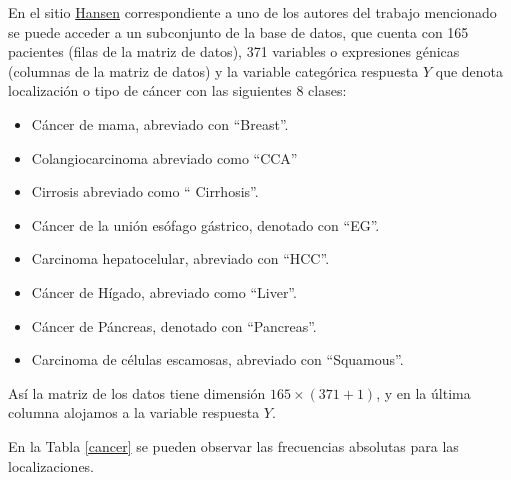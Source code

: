 \documentclass{report}
\begin{document}
 En el sitio  \href{https://github.com/nielsrhansen/msgl/blob/master/data/PrimaryCancers.RData}{Hansen} correspondiente a uno de los autores del trabajo mencionado se puede acceder a un subconjunto de la base de datos, que cuenta con 165 pacientes (filas de la matriz de datos), 371 variables o expresiones génicas (columnas de la matriz de datos)  y la variable categórica respuesta $Y$ que denota localización o tipo de cáncer con las siguientes 8 clases: 
 \begin{itemize}
 	\item Cáncer de mama, abreviado con ``Breast''.
 	\item Colangiocarcinoma abreviado como ``CCA'' %
 	\item  Cirrosis abreviado como `` Cirrhosis''.
 	\item Cáncer de la unión esófago gástrico,   denotado con ``EG''.
 	\item Carcinoma hepatocelular, abreviado con ``HCC''.
 	\item Cáncer de Hígado, abreviado como  ``Liver''. 
 	\item 						Cáncer de Páncreas, denotado con ``Pancreas''.
 	\item Carcinoma de células escamosas, abreviado con ``Squamous''.
 	
 \end{itemize}
 
 Así la matriz de los datos tiene dimensión $165\times (371+1)$, y en la última columna alojamos a la variable respuesta $Y$.
 
 
 En la Tabla 	\ref{cancer} se pueden observar las frecuencias absolutas para las localizaciones. 
 
\end{document}
